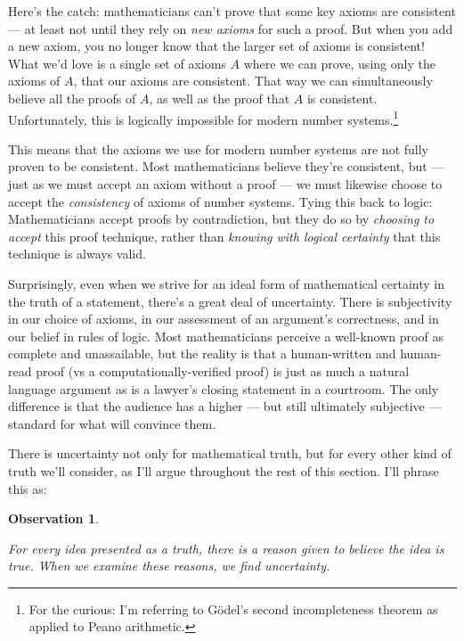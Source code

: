 \documentclass[9pt, twoside]{book}
\newtheorem{obs}{Observation}
\theoremstyle{argtstyle}
\begin{document}
\begin{itemize}
        Here's the catch: mathematicians can't prove that some key axioms are
        consistent --- at least not until they rely on {\em new axioms} for such
        a proof. But when you add a new axiom, you no longer know that the
        larger set of axioms is consistent! What we'd love is a single set of
        axioms $A$ where we can prove, using only the axioms of $A$, that our
        axioms are consistent. That way we can simultaneously believe all the
        proofs of $A$, as
        well as the proof that $A$ is consistent. Unfortunately, this is
        logically impossible for modern number
        systems.\footnote{For
        the curious: I'm referring to G\"odel's second
        incompleteness theorem as applied to Peano arithmetic.}
        
        This means that the axioms we use for
        modern number systems are
        not fully proven to be consistent.
        Most mathematicians believe they're
        consistent, but --- just as we
        must accept an axiom without a proof ---
        we must likewise choose to accept
        the {\em consistency} of axioms of number
        systems.
        Tying this back to logic: Mathematicians
        accept proofs by contradiction, but they
        do so by {\em choosing to accept} this
        proof technique, rather than
        {\em knowing with logical certainty} that this
        technique is always valid.
\end{itemize}

Surprisingly,
even when we strive for an ideal form of
mathematical certainty in the truth of a statement, there's a great deal of
uncertainty.
There is subjectivity in our choice of axioms,
in our assessment of an argument's correctness,
and
in our belief in rules of logic.
Most mathematicians perceive a well-known proof as complete and unassailable,
but the reality is that a human-written and human-read proof (vs
a computationally-verified proof) is just as much a natural language argument as
is a lawyer's closing statement in a courtroom.
The only difference is that the audience has a higher --- but still ultimately
subjective --- standard for what will convince them.

There is uncertainty not only for mathematical truth, but for
every other kind of truth we'll consider, as I'll argue throughout
the rest of this section.
I'll phrase this as:

\newcommand{\obsone}{
    For every idea presented as a truth, there is a reason
    given to believe the idea is true.
    When we examine these reasons, we find uncertainty.
}
\begin{obs}\label{o1}
    \obsone
\end{obs}
\end{document}
